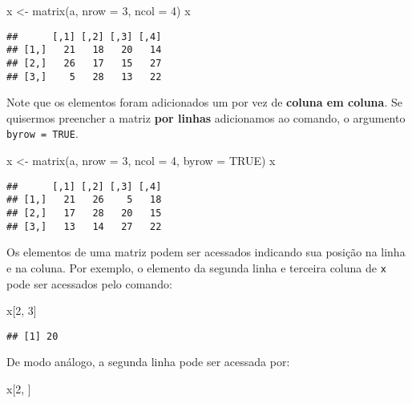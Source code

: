 \documentclass[
]{book}
\newenvironment{Shaded}{\begin{snugshade}}{\end{snugshade}}
\newcommand{\AttributeTok}[1]{\textcolor[rgb]{0.77,0.63,0.00}{#1}}
\newcommand{\ConstantTok}[1]{\textcolor[rgb]{0.00,0.00,0.00}{#1}}
\newcommand{\DecValTok}[1]{\textcolor[rgb]{0.00,0.00,0.81}{#1}}
\newcommand{\FunctionTok}[1]{\textcolor[rgb]{0.00,0.00,0.00}{#1}}
\newcommand{\NormalTok}[1]{#1}
\newcommand{\OtherTok}[1]{\textcolor[rgb]{0.56,0.35,0.01}{#1}}
\begin{document}
\begin{Shaded}
\begin{Highlighting}[]
\NormalTok{x }\OtherTok{\textless{}{-}} \FunctionTok{matrix}\NormalTok{(a, }\AttributeTok{nrow =} \DecValTok{3}\NormalTok{, }\AttributeTok{ncol =} \DecValTok{4}\NormalTok{)}
\NormalTok{x}
\end{Highlighting}
\end{Shaded}

\begin{verbatim}
##      [,1] [,2] [,3] [,4]
## [1,]   21   18   20   14
## [2,]   26   17   15   27
## [3,]    5   28   13   22
\end{verbatim}

Note que os elementos foram adicionados um por vez de \textbf{coluna em coluna}. Se quisermos preencher a matriz \textbf{por linhas} adicionamos ao comando, o argumento \texttt{byrow\ =\ TRUE}.

\begin{Shaded}
\begin{Highlighting}[]
\NormalTok{x }\OtherTok{\textless{}{-}} \FunctionTok{matrix}\NormalTok{(a, }\AttributeTok{nrow =} \DecValTok{3}\NormalTok{, }\AttributeTok{ncol =} \DecValTok{4}\NormalTok{, }\AttributeTok{byrow =} \ConstantTok{TRUE}\NormalTok{)}
\NormalTok{x}
\end{Highlighting}
\end{Shaded}

\begin{verbatim}
##      [,1] [,2] [,3] [,4]
## [1,]   21   26    5   18
## [2,]   17   28   20   15
## [3,]   13   14   27   22
\end{verbatim}

Os elementos de uma matriz podem ser acessados indicando sua posição na linha e na coluna. Por exemplo, o elemento da segunda linha e terceira coluna de \texttt{x} pode ser acessados pelo comando:

\begin{Shaded}
\begin{Highlighting}[]
\NormalTok{x[}\DecValTok{2}\NormalTok{, }\DecValTok{3}\NormalTok{]}
\end{Highlighting}
\end{Shaded}

\begin{verbatim}
## [1] 20
\end{verbatim}

De modo análogo, a segunda linha pode ser acessada por:

\begin{Shaded}
\begin{Highlighting}[]
\NormalTok{x[}\DecValTok{2}\NormalTok{, ]}
\end{Highlighting}
\end{Shaded}
\end{document}
